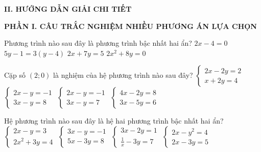 \documentclass[12pt,a4paper]{article}
\begin{document}
\noindent\textbf{\large II. HƯỚNG DẪN GIẢI CHI TIẾT}

\vspace{2mm}
\noindent\textbf{\large PHẦN I. CÂU TRẮC NGHIỆM NHIỀU PHƯƠNG ÁN LỰA CHỌN}
\vspace{1mm}
\begin{ex}
Phương trình nào sau đây là phương trình bậc nhất hai ẩn?
\choice
{$2x - 4 = 0$}
{$5y - 1 = 3(y - 4)$}
{\True $2x + 7y = 5$}
{$2x^2 + 8y = 0$}
\end{ex}

\begin{ex}
Cặp số $(2; 0)$ là nghiệm của hệ phương trình nào sau đây?
\choice
{$\begin{cases} 2x - 2y = 2 \\ x + 2y = 4 \end{cases}$}
{$\begin{cases} 2x - y = -1 \\ 3x - y = 8 \end{cases}$}
{$\begin{cases} 2x - y = -1 \\ 3x - y = 7 \end{cases}$}
{\True $\begin{cases} 4x - 2y = 8 \\ 3x - 5y = 6 \end{cases}$}
\end{ex}

\begin{ex}
Hệ phương trình nào sau đây là hệ hai phương trình bậc nhất hai ẩn?
\choice
{$\begin{cases} 2x - y = 3 \\ 2x^2 + 3y = 4 \end{cases}$}
{\True $\begin{cases} 3x - y = -1 \\ 5x - 3y = 8 \end{cases}$}
{$\begin{cases} 3x - 2y = 1 \\ \frac{1}{x} - 3y = 7 \end{cases}$}
{$\begin{cases} 2x - y^2 = 4 \\ 2x - 3y = 5 \end{cases}$}
\end{ex}
\end{document}

